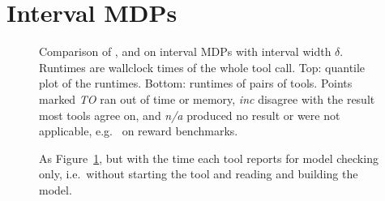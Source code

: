 \documentclass[a4paper]{article}
\begin{document}
\section*{Interval MDPs}

\begin{figure}[t]
    \centering

    \medskip

    \hfill
    \hfill

    \caption{Comparison of \cfgstorm, \cfgprism{} and \cfgintervalmdp{} on interval
    MDPs with interval width $\delta$. Runtimes are wallclock times of the whole tool call. Top: quantile plot of the runtimes. Bottom:
    runtimes of pairs of tools. Points marked \emph{TO} ran out of time or memory,
    \emph{inc} disagree with the result most tools agree on, and \emph{n/a}
    produced no result or were not applicable, e.g.\ \cfgintervalmdp{} on reward
    benchmarks.}
    \label{fig:imdps}
\end{figure}

\begin{figure}[t]
    \centering

    \medskip

    \hfill
    \hfill

    \caption{As Figure~\ref{fig:imdps}, but with the time each tool reports for
    model checking only, i.e.\ without starting the tool and reading and building
    the model.}
    \label{fig:imdps-checking}
\end{figure}
\end{document}
